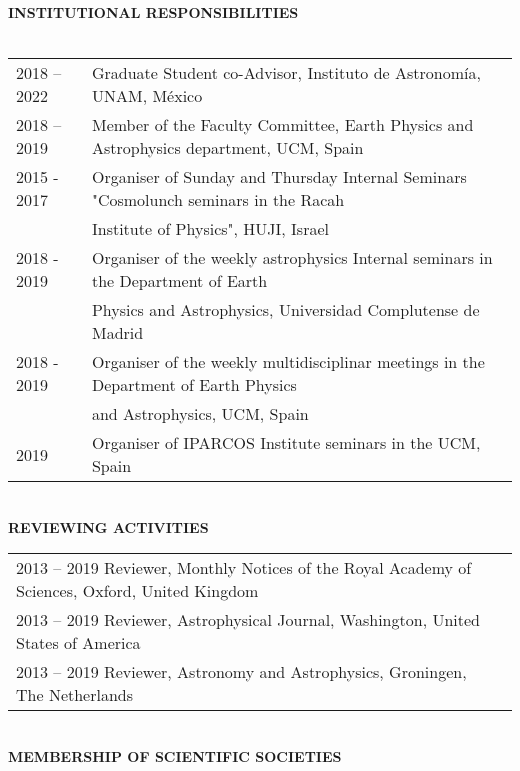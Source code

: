 \documentclass[oneside, a4paper, onecolumn, 11pt]{article}
\begin{document}
{{\bf INSTITUTIONAL RESPONSIBILITIES}\\
\\
\begin{tabular}{ll}
2018 – 2022 &	Graduate Student co-Advisor, Instituto de Astronomía, UNAM, México \\
2018 – 2019 &	Member of the Faculty Committee, Earth Physics and Astrophysics department, UCM, Spain \\ 
2015 - 2017 &	Organiser of Sunday and Thursday Internal Seminars "Cosmolunch seminars in the Racah\\
 &  Institute of Physics", HUJI, Israel \\
2018 - 2019 & Organiser of the weekly astrophysics Internal seminars in the Department of Earth\\
 &  Physics and Astrophysics, Universidad Complutense de Madrid \\
2018 - 2019 & Organiser of the weekly multidisciplinar meetings in the Department of Earth Physics\\ & and Astrophysics, UCM, Spain \\
2019 & Organiser of IPARCOS Institute seminars in the UCM, Spain \\
\end{tabular}\\

{\bf REVIEWING ACTIVITIES}\\

\begin{tabular}{ll}
2013 – 2019	Reviewer, Monthly Notices of the Royal Academy of Sciences, Oxford, United Kingdom  \\
2013 – 2019	Reviewer, Astrophysical Journal, Washington, United States of America  \\
2013 – 2019	Reviewer, Astronomy and Astrophysics, Groningen, The Netherlands  \\
\end{tabular}\\

{\bf MEMBERSHIP OF SCIENTIFIC SOCIETIES}\\

}
\end{document}
